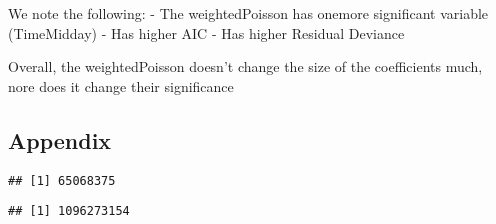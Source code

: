 \documentclass[]{article}
\newenvironment{Shaded}{\begin{snugshade}}{\end{snugshade}}
\newcommand{\DecValTok}[1]{\textcolor[rgb]{0.00,0.00,0.81}{#1}}
\newcommand{\KeywordTok}[1]{\textcolor[rgb]{0.13,0.29,0.53}{\textbf{#1}}}
\newcommand{\NormalTok}[1]{#1}
\newcommand{\OperatorTok}[1]{\textcolor[rgb]{0.81,0.36,0.00}{\textbf{#1}}}
\newcommand{\StringTok}[1]{\textcolor[rgb]{0.31,0.60,0.02}{#1}}
\begin{document}
We note the following: - The weightedPoisson has onemore significant
variable (TimeMidday) - Has higher AIC - Has higher Residual Deviance

Overall, the weightedPoisson doesn't change the size of the coefficients
much, nore does it change their significance

\hypertarget{appendix}{%
\subsection{Appendix}\label{appendix}}

\begin{Shaded}
\end{Shaded}

\begin{verbatim}
## [1] 65068375
\end{verbatim}

\begin{Shaded}
\end{Shaded}

\begin{verbatim}
## [1] 1096273154
\end{verbatim}
\end{document}
